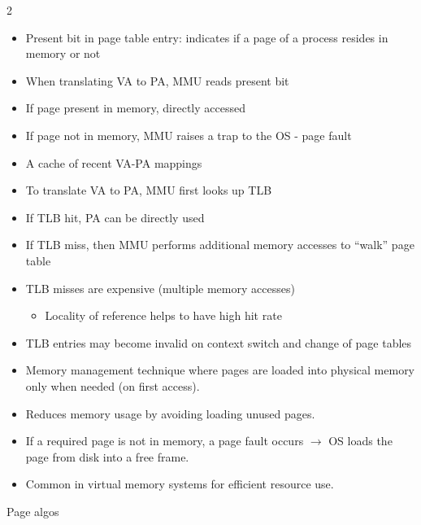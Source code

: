\begin{multicols}{2}

\begin{itemize}[noitemsep]
    \item Present bit in page table entry: indicates if a page of a process resides in memory or not
    \item When translating VA to PA, MMU reads present bit
    \item If page present in memory, directly accessed
   \item If page not in memory, MMU raises a trap to the OS - page fault
\end{itemize}


\begin{itemize}[noitemsep]
    \item A cache of recent VA-PA mappings
    \item To translate VA to PA, MMU first looks up TLB
    \item If TLB hit, PA can be directly used
    \item If TLB miss, then MMU performs additional memory accesses to ``walk'' page table
    \item TLB misses are expensive (multiple memory accesses)
    \begin{itemize}[noitemsep]
        \item Locality of reference helps to have high hit rate
    \end{itemize}
    \item TLB entries may become invalid on context switch and change of page tables
\end{itemize}

\begin{itemize}[noitemsep]
    \item Memory management technique where pages are loaded into physical memory only when needed (on first access).
    \item Reduces memory usage by avoiding loading unused pages.
    \item If a required page is not in memory, a page fault occurs $\to$ OS loads the page from disk into a free frame.
    \item Common in virtual memory systems for efficient resource use.
\end{itemize}

\columnbreak

Page algos
\end{multicols}